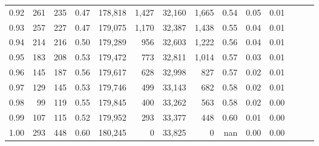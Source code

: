 \begin{tabular}{rrrrrrrrrrrrrr}
0.92 &    261 &  235 &  0.47 &  178,818 &    1,427 &  32,160 &   1,665 &  0.54 &  0.05 &      0.01 \\
0.93 &    257 &  227 &  0.47 &  179,075 &    1,170 &  32,387 &   1,438 &  0.55 &  0.04 &      0.01 \\
0.94 &    214 &  216 &  0.50 &  179,289 &      956 &  32,603 &   1,222 &  0.56 &  0.04 &      0.01 \\
0.95 &    183 &  208 &  0.53 &  179,472 &      773 &  32,811 &   1,014 &  0.57 &  0.03 &      0.01 \\
0.96 &    145 &  187 &  0.56 &  179,617 &      628 &  32,998 &     827 &  0.57 &  0.02 &      0.01 \\
0.97 &    129 &  145 &  0.53 &  179,746 &      499 &  33,143 &     682 &  0.58 &  0.02 &      0.01 \\
0.98 &     99 &  119 &  0.55 &  179,845 &      400 &  33,262 &     563 &  0.58 &  0.02 &      0.00 \\
0.99 &    107 &  115 &  0.52 &  179,952 &      293 &  33,377 &     448 &  0.60 &  0.01 &      0.00 \\
1.00 &    293 &  448 &  0.60 &  180,245 &        0 &  33,825 &       0 &   nan &  0.00 &      0.00 \\
\bottomrule
\end{tabular}
